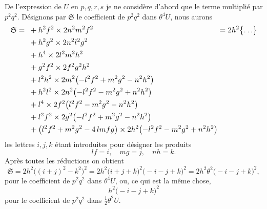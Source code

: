 \documentclass[11pt]{article}
\begin{document}
De l'expression de $U$ en $p, q, r, s$ je ne consid\`ere d'abord que le terme multipli\'e par $p^{2} q^{2}$. D\'esignons par $\mathfrak{S}$ le coefficient de $p^{2} q^{2}$ dans $\theta^{4} U$, nous aurons
\[
\resizebox{\textwidth}{!}{$\displaystyle
\mathfrak{S} = \;
\begin{aligned}[t]
& + h^{2} f^{2} \times 2 n^{2} m^{2} f^{2} \\
& + h^{2} g^{2} \times 2 n^{2} l^{2} g^{2} \\
& + h^{4} \times 2 l^{2} m^{2} h^{2} \\
& + g^{2} f^{2} \times 2 f^{2} g^{2} h^{2} \\
& + l^{2} h^{2} \times 2 m^{2}\bigl(-l^{2} f^{2} + m^{2} g^{2} - n^{2} h^{2}\bigr) \\
& + h^{2} l^{2} \times 2 n^{2}\bigl(-l^{2} f^{2} - m^{2} g^{2} + n^{2} h^{2}\bigr) \\
& + l^{4} \times 2 f^{2}\bigl(l^{2} f^{2} - m^{2} g^{2} - n^{2} h^{2}\bigr) \\
& + l^{2} f^{2} \times 2 g^{2}\bigl(-l^{2} f^{2} + m^{2} g^{2} - n^{2} h^{2}\bigr) \\
& + \bigl(l^{2} f^{2} + m^{2} g^{2} - 4\,lmfg\bigr) \times 2 h^{2}\bigl(-l^{2} f^{2} - m^{2} g^{2} + n^{2} h^{2}\bigr)
\end{aligned}
= 2 h^{2}\bigl\{ \ldots \bigr\}
$}
\]
les lettres $i, j, k$ \'etant introduites pour d\'esigner les produits
\[
lf = i,\quad mg = j,\quad nh = k.
\]
Apr\`es toutes les r\'eductions on obtient
\[
\mathfrak{S} = 2 h^{2}\bigl((i+j)^{2} - k^{2}\bigr)^{2} = 2 h^{2}\bigl(i + j + k\bigr)^{2}\bigl(-i - j + k\bigr)^{2} = 2 h^{2} \theta^{2}\bigl(-i - j + k\bigr)^{2},
\]
pour le coefficient de $p^{2} q^{2}$ dans $\theta^{4} U$, ou, ce qui est la m\^eme chose,
\[
h^{2}\bigl(-i - j + k\bigr)^{2}
\]
pour le coefficient de $p^{2} q^{2}$ dans $\tfrac{1}{2}\theta^{2} U$.
\end{document}
